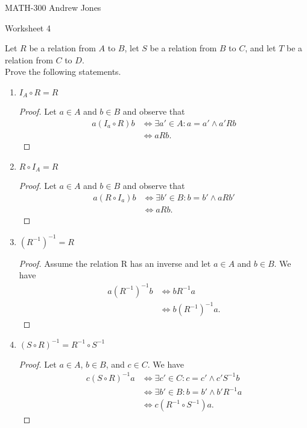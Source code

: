 \documentclass{article}
\begin{document}
    MATH-300 \hfill Andrew Jones
  \begin{center}
  {\huge Worksheet 4}
  \end{center}
  Let $R$ be a relation from $A$ to $B$, let $S$ be a relation from $B$ to $C$, and let $T$ be a relation from $C$ to $D$. \\ Prove the following statements. \\
  \begin{enumerate}
    \item $I_A \circ R = R$
      \begin{proof}
        Let $a\in A$ and $b\in B$ and observe that
        \begin{align*}
          a(I_a \circ R)b &\iff \exists a'\in A: a = a' \wedge a'Rb \\
	  &\iff aRb.
        \end{align*}
      \end{proof}
    \item $R \circ I_A = R$
      \begin{proof}
        Let $a\in A$ and $b\in B$ and observe that
        \begin{align*}
          a(R \circ I_a)b &\iff \exists b'\in B: b = b' \wedge aRb' \\
	  &\iff aRb.
        \end{align*}
      \end{proof}
    \item $(R^{-1})^{-1} = R$
      \begin{proof}
        Assume the relation R has an inverse and let $a\in A$ and $b\in B$. We have
        \begin{align*}
          a(R^{-1})^{-1}b &\iff bR^{-1}a \\
	  &\iff b(R^{-1})^{-1}a.
        \end{align*}
      \end{proof}
    \item $(S \circ R)^{-1} = R^{-1}\circ S^{-1}$
      \begin{proof}
      Let $a\in A$, $b\in B$, and $c\in C$. We have
        \begin{align*}
          c(S \circ R)^{-1}a &\iff \exists c'\in C: c = c' \wedge c'S^{-1}b \\
          &\iff \exists b'\in B: b=b' \wedge b'R^{-1}a \\
	  &\iff c(R^{-1} \circ S^{-1})a.
        \end{align*}
      \end{proof}

\end{enumerate}
\end{document}
